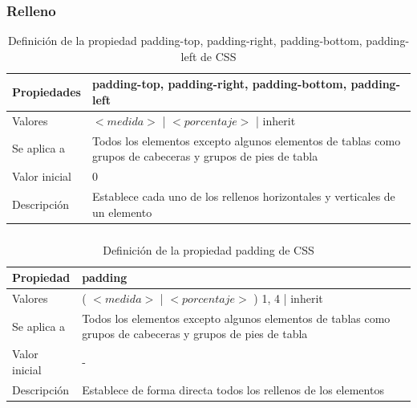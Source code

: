 
\begin{frame}
\frametitle{Relleno}

\begin{center}
  \begin{table}
   \begin{tabular}{p{1.8cm}p{7.8cm}}
Propiedades &\bf{padding-top}, \bf{padding-right}, \bf{padding-bottom}, \bf{padding-left} \\ \hline
Valores & $<medida>$ | $<porcentaje>$ | inherit \\ \hline
Se aplica a & Todos los elementos excepto algunos elementos de tablas como grupos de cabeceras y grupos de pies de tabla \\ \hline
Valor inicial & 0 \\ \hline
Descripción & Establece cada uno de los rellenos horizontales y verticales de un elemento \\ \hline
  \end{tabular}
   \caption{Definición de la propiedad padding-top, padding-right, padding-bottom, padding-left de CSS}
 \end{table}
\end{center}

\end{frame}


\begin{frame}
\frametitle{}

\begin{center}
  \begin{table}
   \begin{tabular}{p{1.8cm}p{7.8cm}}
Propiedad &\bf{padding} \\ \hline
Valores & ( $<medida>$ | $<porcentaje>$ ) {1, 4} | inherit \\ \hline
Se aplica a & Todos los elementos excepto algunos elementos de tablas como grupos de cabeceras y grupos de pies de tabla \\ \hline
Valor inicial & - \\ \hline
Descripción & Establece de forma directa todos los rellenos de los elementos \\ \hline
  \end{tabular}
   \caption{Definición de la propiedad padding de CSS}
 \end{table}
\end{center}

\end{frame}

